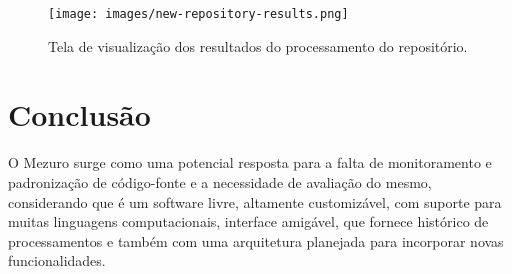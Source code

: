 \documentclass[12pt]{article}
\begin{document}
    \begin{figure}[H]
      \centering
      \texttt{[image: images/new-repository-results.png]}
      \caption{Tela de visualização dos resultados do processamento do repositório.}
      \label{fig:results}
    \end{figure}

\section{Conclusão}
O Mezuro surge como uma potencial resposta para a falta de monitoramento e padronização de código-fonte e a necessidade de avaliação do mesmo, considerando que é um software livre, altamente customizável, com suporte para muitas linguagens computacionais, interface amigável, que fornece histórico de processamentos e também com uma arquitetura planejada para incorporar novas funcionalidades.



\end{document}
